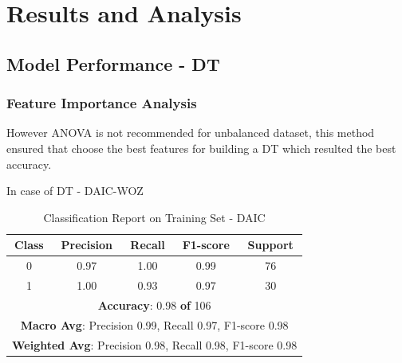 \section{Results and Analysis}



\subsection{Model Performance - DT}

\subsubsection{Feature Importance Analysis}
However ANOVA is not recommended for unbalanced dataset, this method ensured that choose the best features for building a DT which resulted the best accuracy. 


In case of DT - DAIC-WOZ

\begin{table}[H]
\centering

\label{table:classification_report_train}
\begin{tabular}{|c|c|c|c|c|}
\hline
\textbf{Class} & \textbf{Precision} & \textbf{Recall} & \textbf{F1-score} & \textbf{Support} \\ \hline
0              & 0.97               & 1.00            & 0.99              & 76               \\ \hline
1              & 1.00               & 0.93            & 0.97              & 30               \\ \hline
\multicolumn{5}{|c|}{\textbf{Accuracy}: 0.98 \textbf{of} 106}                         \\ \hline
\multicolumn{5}{|c|}{\textbf{Macro Avg}: Precision 0.99, Recall 0.97, F1-score 0.98} \\ \hline
\multicolumn{5}{|c|}{\textbf{Weighted Avg}: Precision 0.98, Recall 0.98, F1-score 0.98} \\ \hline
\end{tabular}
\caption{Classification Report on Training Set - DAIC}
\end{table}

